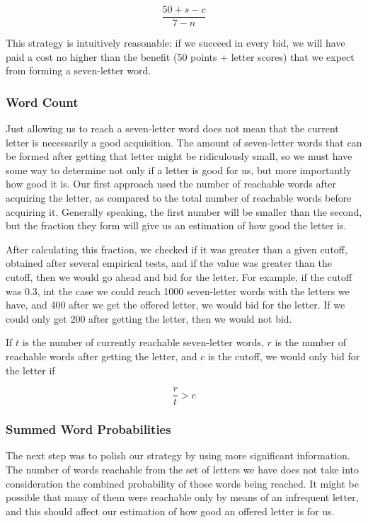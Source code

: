 \documentclass[11pt]{article}
\begin{document}
$$\frac{50+s-c}{7-n}$$

This strategy is intuitively reasonable: if we succeed in every bid, we will have paid a cost no higher than the benefit (50 points + letter scores) that we expect from forming a seven-letter word.

\subsubsection{Word Count}

Just allowing us to reach a seven-letter word does not mean that the current letter is necessarily a good acquisition. The amount of seven-letter words that can be formed after getting that letter might be ridiculously small, so we must have some way to determine not only if a letter is good for us, but more importantly how good it is. Our first approach used the number of reachable words after acquiring the letter, as compared to the total number of reachable words before acquiring it. Generally speaking, the first number will be smaller than the second, but the fraction they form will give us an estimation of how good the letter is.

After calculating this fraction, we checked if it was greater than a given cutoff, obtained after several empirical tests, and if the value was greater than the cutoff, then we would go ahead and bid for the letter. For example, if the cutoff was 0.3, int the case we could reach 1000 seven-letter words with the letters we have, and 400 after we get the offered letter, we would bid for the letter. If we could only get 200 after getting the letter, then we would not bid. 

If $t$ is the number of currently reachable seven-letter words, $r$ is the number of reachable words after getting the letter, and $c$ is the cutoff, we would only bid for the letter if

$$\frac{r}{t}>c$$

\subsubsection{Summed Word Probabilities}

The next step was to polish our strategy by using more significant information. The number of words reachable from the set of letters we have does not take into consideration the combined probability of those words being reached. It might be possible that many of them were reachable only by means of an infrequent letter, and this should affect our estimation of how good an offered letter is for us.
\end{document}

